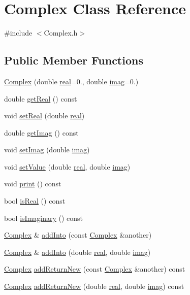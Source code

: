 \hypertarget{classComplex}{}\section{Complex Class Reference}
\label{classComplex}


{\ttfamily \#include $<$Complex.\+h$>$}

\subsection*{Public Member Functions}
\begin{DoxyCompactItemize}
\item 
\hyperlink{classComplex_a2bce7c231cd74634e24deb37b4e2d61d}{Complex} (double \hyperlink{classComplex_a0138f5fe2b2c6180b8fcda77a7aa51c5}{real}=0., double \hyperlink{classComplex_a2bb90cc563599c3c8bdec9acf9ea40a6}{imag}=0.)
\item 
double \hyperlink{classComplex_abe3d69aff637b06e1c1f73c14368d77d}{get\+Real} () const 
\item 
void \hyperlink{classComplex_ac767331bf173de715f47589d6f614a6d}{set\+Real} (double \hyperlink{classComplex_a0138f5fe2b2c6180b8fcda77a7aa51c5}{real})
\item 
double \hyperlink{classComplex_a06791ae9b7d850ef7de11d93e997af94}{get\+Imag} () const 
\item 
void \hyperlink{classComplex_ab94d5256ccb9a936df00e4bdd6f8f259}{set\+Imag} (double \hyperlink{classComplex_a2bb90cc563599c3c8bdec9acf9ea40a6}{imag})
\item 
void \hyperlink{classComplex_a753e3d6a1b2df1950ba4caebe70382fe}{set\+Value} (double \hyperlink{classComplex_a0138f5fe2b2c6180b8fcda77a7aa51c5}{real}, double \hyperlink{classComplex_a2bb90cc563599c3c8bdec9acf9ea40a6}{imag})
\item 
void \hyperlink{classComplex_a7c2092a00caf353537f698316be20b19}{print} () const 
\item 
bool \hyperlink{classComplex_a5775caffefa608486555f2bdac89a1ec}{is\+Real} () const 
\item 
bool \hyperlink{classComplex_ace89217819bbbd46a9a9f2e51ea7beed}{is\+Imaginary} () const 
\item 
\hyperlink{classComplex}{Complex} \& \hyperlink{classComplex_aa6e77da8ab7b7177b12a7fb0c4fb9e75}{add\+Into} (const \hyperlink{classComplex}{Complex} \&another)
\item 
\hyperlink{classComplex}{Complex} \& \hyperlink{classComplex_ad0a009826e3f2b972c5a4dbf40bd3805}{add\+Into} (double \hyperlink{classComplex_a0138f5fe2b2c6180b8fcda77a7aa51c5}{real}, double \hyperlink{classComplex_a2bb90cc563599c3c8bdec9acf9ea40a6}{imag})
\item 
\hyperlink{classComplex}{Complex} \hyperlink{classComplex_a9461ded91a8b436b6c01a0549a7982e3}{add\+Return\+New} (const \hyperlink{classComplex}{Complex} \&another) const 
\item 
\hyperlink{classComplex}{Complex} \hyperlink{classComplex_a2e9ef45e71d07776d7cbd4999d6d85a7}{add\+Return\+New} (double \hyperlink{classComplex_a0138f5fe2b2c6180b8fcda77a7aa51c5}{real}, double \hyperlink{classComplex_a2bb90cc563599c3c8bdec9acf9ea40a6}{imag}) const 
\end{DoxyCompactItemize}
